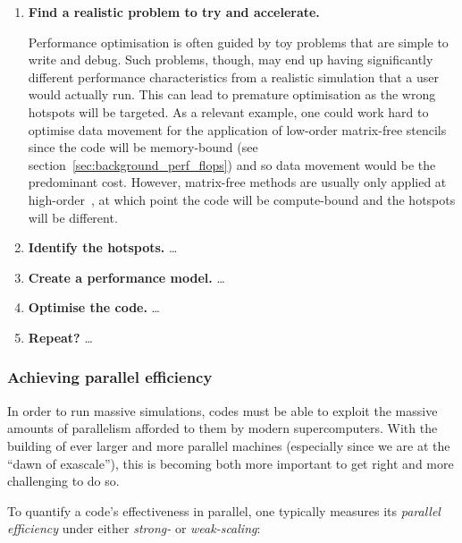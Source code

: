 \begin{enumerate}
  \item
    \textbf{Find a realistic problem to try and accelerate.}

    Performance optimisation is often guided by toy problems that are simple to write and debug.
    Such problems, though, may end up having significantly different performance characteristics from a realistic simulation that a user would actually run.
    This can lead to premature optimisation as the wrong hotspots will be targeted.
    As a relevant example, one could work hard to optimise data movement for the application of low-order matrix-free stencils since the code will be memory-bound (see section~\ref{sec:background_perf_flops}) and so data movement would be the predominant cost.
    However, matrix-free methods are usually only applied at high-order~\cite{brownPerformancePortableSolid2022}, at which point the code will be compute-bound and the hotspots will be different.
  \item
    \textbf{Identify the hotspots.}
    \dots
  \item
    \textbf{Create a performance model.}
    \dots
  \item
    \textbf{Optimise the code.}
    \dots
  \item
    \textbf{Repeat?}
    \dots
\end{enumerate}

\subsubsection{Achieving parallel efficiency}
\label{sec:background_perf_efficiency}

In order to run massive simulations, codes must be able to exploit the massive amounts of parallelism afforded to them by modern supercomputers.
With the building of ever larger and more parallel machines (especially since we are at the ``dawn of exascale''), this is becoming both more important to get right and more challenging to do so.

To quantify a code's effectiveness in parallel, one typically measures its \textit{parallel efficiency} under either \textit{strong-} or \textit{weak-scaling}:

